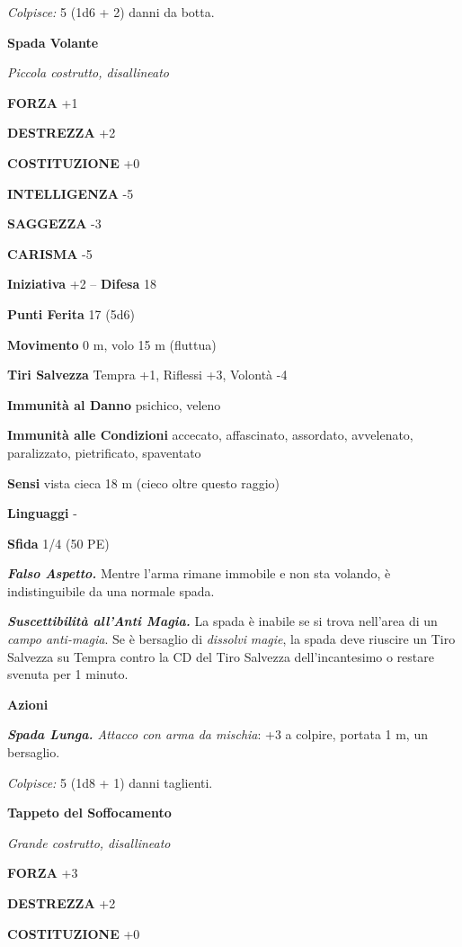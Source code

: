\begin{multicols}{2}
\emph{Colpisce:} 5 (1d6 + 2) danni da botta.

\medskip{}\textbf{Spada Volante}

\emph{Piccola costrutto, disallineato}

\textbf{FORZA} +1

\textbf{DESTREZZA} +2

\textbf{COSTITUZIONE} +0

\textbf{INTELLIGENZA} -5

\textbf{SAGGEZZA} -3

\textbf{CARISMA} -5

\textbf{Iniziativa} +2 -- \textbf{Difesa} 18

\textbf{Punti Ferita} 17 (5d6)

\textbf{Movimento} 0 m, volo 15 m (fluttua)

\textbf{Tiri Salvezza}  Tempra +1, Riflessi +3, Volontà -4

\textbf{Immunità al Danno} psichico, veleno

\textbf{Immunità alle Condizioni} accecato, affascinato, assordato, avvelenato, paralizzato, pietrificato, spaventato

\textbf{Sensi} vista cieca 18 m (cieco oltre questo raggio)

\textbf{Linguaggi} -

\textbf{Sfida} 1/4 (50 PE)

\emph{\textbf{Falso Aspetto.}} Mentre l'arma rimane immobile e non sta volando, è indistinguibile da una normale spada.

\emph{\textbf{Suscettibilità all'Anti Magia.}} La spada è inabile se si trova nell'area di un \emph{campo anti-magia}. Se è bersaglio di \emph{dissolvi} \emph{magie}, la spada deve riuscire un Tiro Salvezza su Tempra contro la CD del Tiro Salvezza dell'incantesimo o restare svenuta per 1 minuto.

\textbf{Azioni}

\emph{\textbf{Spada Lunga.} Attacco con arma da mischia}: +3 a colpire, portata 1 m, un bersaglio.

\emph{Colpisce:} 5 (1d8 + 1) danni taglienti.


\medskip{}\textbf{Tappeto del Soffocamento}

\emph{Grande costrutto, disallineato}

\textbf{FORZA} +3

\textbf{DESTREZZA} +2

\textbf{COSTITUZIONE} +0


\end{multicols}
